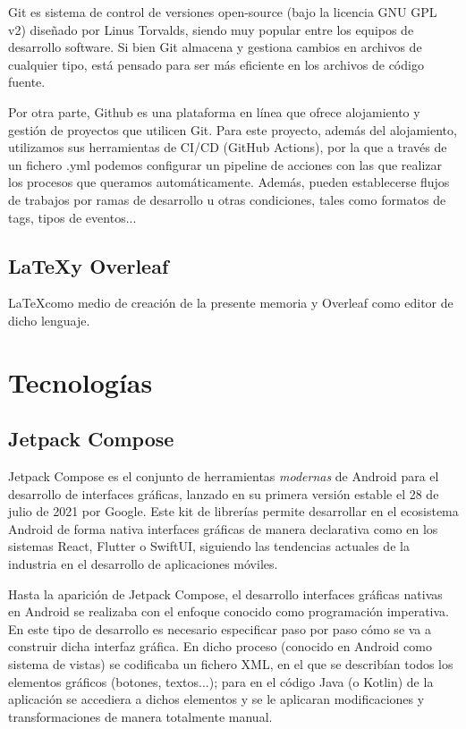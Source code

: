             Git es sistema de control de versiones open-source (bajo la licencia GNU GPL v2) diseñado por Linus Torvalds, siendo muy popular entre los equipos de desarrollo software. Si bien Git almacena y gestiona cambios en archivos de cualquier tipo, está pensado para ser más eficiente en los archivos de código fuente.
            
            Por otra parte, Github es una plataforma en línea que ofrece alojamiento y gestión de proyectos que utilicen Git. Para este proyecto, además del alojamiento, utilizamos sus herramientas de CI/CD (GitHub Actions), por la que a través de un fichero .yml podemos configurar un pipeline de acciones con las que realizar los procesos que queramos automáticamente. Además, pueden establecerse flujos de trabajos por ramas de desarrollo u otras condiciones, tales como formatos de tags, tipos de eventos...
            
        
        \subsection{\LaTeX y Overleaf}
        \LaTeX como medio de creación de la presente memoria y Overleaf como editor de dicho lenguaje.


    \section{Tecnologías}
        \subsection{Jetpack Compose}
            Jetpack Compose es el conjunto de herramientas \textit{modernas} de Android para el desarrollo de interfaces gráficas, lanzado en su primera versión estable el 28 de julio de 2021 por Google. Este kit de librerías permite desarrollar en el ecosistema Android de forma nativa interfaces gráficas de manera declarativa como en los sistemas React, Flutter o SwiftUI, siguiendo las tendencias actuales de la industria en el desarrollo de aplicaciones móviles.

            Hasta la aparición de Jetpack Compose, el desarrollo interfaces gráficas nativas en Android se realizaba con el enfoque conocido como programación imperativa. En este tipo de desarrollo es necesario especificar paso por paso cómo se va a construir dicha interfaz gráfica. En dicho proceso (conocido en Android como sistema de vistas) se codificaba un fichero XML, en el que se describían todos los elementos gráficos (botones, textos...); para en el código Java (o Kotlin) de la aplicación se accediera a dichos elementos y se le aplicaran modificaciones y transformaciones de manera totalmente manual.

